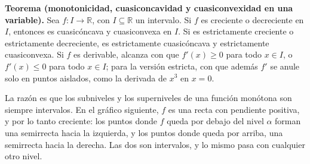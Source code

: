 \documentclass{article}
\newcommand{\R}{\ensuremath{\mathbb{R}}}
\begin{document}
\begin{center}
\end{center}


\noindent\textbf{\color{teal}Teorema (monotonicidad, cuasiconcavidad y cuasiconvexidad en una variable).}
Sea \(f\colon I\to\R\), con \(I\subseteq\R\) un intervalo. Si \(f\) es creciente o decreciente en \(I\), entonces es cuasicóncava y cuasiconvexa en \(I\). Si es estrictamente creciente o estrictamente decreciente, es estrictamente cuasicóncava y estrictamente cuasiconvexa. Si \(f\) es derivable, alcanza con que \(f'(x)\ge0\) para todo \(x\in I\), o \(f'(x)\le0\) para todo \(x\in I\); para la versión estricta, con que además \(f'\) se anule solo en puntos aislados, como la derivada de \(x^3\) en \(x=0\).

La razón es que los subniveles y los superniveles de una función monótona son siempre intervalos. En el gráfico siguiente, \(f\) es una recta con pendiente positiva, y por lo tanto creciente: los puntos donde \(f\) queda por debajo del nivel \(\alpha\) forman una semirrecta hacia la izquierda, y los puntos donde queda por arriba, una semirrecta hacia la derecha. Las dos son intervalos, y lo mismo pasa con cualquier otro nivel.
\end{document}
